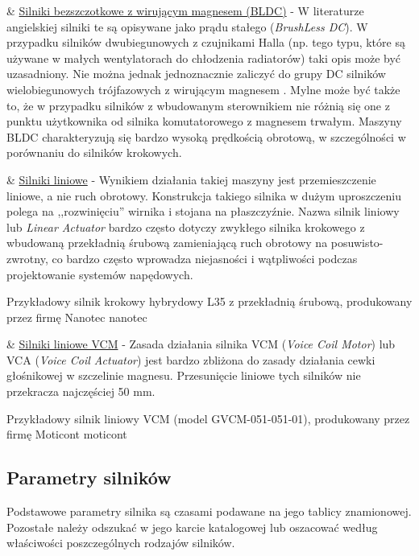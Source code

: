 \begin{easylist}
	& \underline{Silniki bezszczotkowe z wirującym magnesem (BLDC)} - W literaturze angielskiej silniki te są opisywane jako prądu stałego ({\em BrushLess DC}). W przypadku silników dwubiegunowych z czujnikami Halla (np. tego typu, które są używane w małych wentylatorach do chłodzenia radiatorów) taki opis może być uzasadniony. Nie można jednak jednoznacznie zaliczyć do grupy DC silników wielobiegunowych trójfazowych z wirującym magnesem \cite{przepiorkowski}. Mylne może być także to, że w przypadku silników z wbudowanym sterownikiem nie różnią się one z punktu użytkownika od silnika komutatorowego z magnesem trwałym. Maszyny BLDC charakteryzują się bardzo wysoką prędkością obrotową, w szczególności w porównaniu do silników krokowych.	
	
	& \underline{Silniki liniowe} - Wynikiem działania takiej maszyny jest przemieszczenie liniowe, a nie ruch obrotowy. Konstrukcja takiego silnika w dużym uproszczeniu polega na ,,rozwinięciu'' wirnika i stojana na płaszczyźnie. Nazwa silnik liniowy lub {\em Linear Actuator} bardzo często dotyczy zwykłego silnika krokowego z wbudowaną przekładnią śrubową zamieniającą ruch obrotowy na posuwisto-zwrotny, co bardzo często wprowadza niejasności i wątpliwości podczas projektowanie systemów napędowych.
	
		{Przykładowy silnik krokowy hybrydowy L35 z przekładnią śrubową, produkowany przez firmę Nanotec}
		{nanotec}
	
	& \underline{Silniki liniowe VCM} - Zasada działania silnika VCM ({\em Voice Coil Motor}) lub VCA ({\em Voice Coil Actuator}) jest bardzo zbliżona do zasady działania cewki głośnikowej w szczelinie magnesu. Przesunięcie liniowe tych silników nie przekracza najczęściej 50 mm.		
	
\end{easylist} 

	{Przykładowy silnik liniowy VCM (model GVCM-051-051-01), produkowany przez firmę Moticont}
	{moticont}
	
\subsection{Parametry silników}

Podstawowe parametry silnika są czasami podawane na jego tablicy znamionowej. Pozostałe należy odszukać w jego karcie katalogowej lub oszacować według właściwości poszczególnych rodzajów silników.
\\

